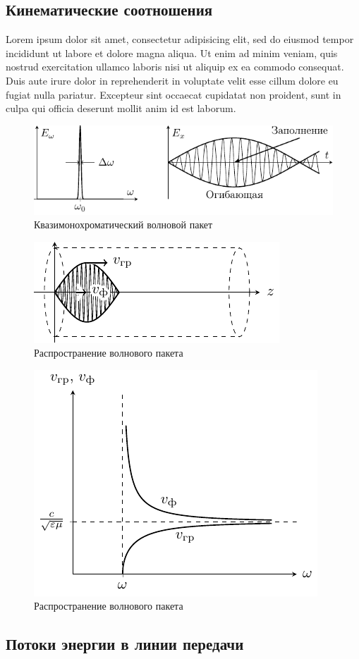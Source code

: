 \subsection{Кинематические соотношения}
Lorem ipsum dolor sit amet, consectetur adipisicing elit, sed do eiusmod
tempor incididunt ut labore et dolore magna aliqua. Ut enim ad minim veniam,
quis nostrud exercitation ullamco laboris nisi ut aliquip ex ea commodo
consequat. Duis aute irure dolor in reprehenderit in voluptate velit esse
cillum dolore eu fugiat nulla pariatur. Excepteur sint occaecat cupidatat non
proident, sunt in culpa qui officia deserunt mollit anim id est laborum.
\begin{figure}[H]
	\centering
	\includegraphics[scale=1.5]{img/lect3_ris8}
	\caption{Квазимонохроматический волновой пакет}
	\label{fig:lect3:8}
\end{figure}

\begin{figure}[H]
	\centering
	\includegraphics[scale=1.5]{img/lect3_ris9}
	\caption{Распространение волнового пакета}
	\label{fig:lect3:9}
\end{figure}

\begin{figure}[H]
	\centering
	\includegraphics[scale=1.5]{img/lect3_ris10}
	\caption{Распространение волнового пакета}
	\label{fig:lect3:10}
\end{figure}

\subsection{Потоки энергии в линии передачи}
